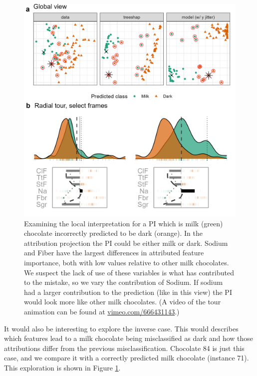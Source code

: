 \documentclass[
]{article}
\begin{document}
\begin{figure}

{\centering \includegraphics[width=1\linewidth]{./figures/case_chocolates_inverse} 

}

\caption{Examining the local interpretation for a PI which is milk (green) chocolate incorrectly predicted to be dark (orange). In the attribution projection the PI could be either milk or dark. Sodium and Fiber have the largest differences in attributed feature importance, both with low values relative to other milk chocolates. We suspect the lack of use of these variables is what has contributed to the mistake, so we vary the contribution of Sodium. If sodium had a larger contribution to the prediction (like in this view) the PI would look more like other milk chocolates. (A video of the tour animation can be found at \href{https://vimeo.com/666431143}{vimeo.com/666431143}.)}\label{fig:casechocolatesinverse}
\end{figure}

It would also be interesting to explore the inverse case. This would describes which features lead to a milk chocolate being misclassified as dark and how those attributions differ from the previous misclassification. Chocolate 84 is just this case, and we compare it with a correctly predicted milk chocolate (instance 71). This exploration is shown in Figure \ref{fig:casechocolatesinverse}.
\end{document}
